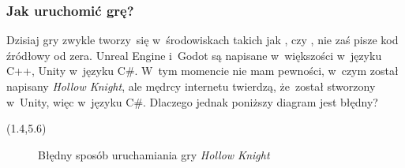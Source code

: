 \documentclass[10pt,t]{beamer}
\begin{document}
\begin{frame}
  \frametitle{Jak uruchomić grę?}


  Dzisiaj gry zwykle tworzy~się w~środowiskach takich jak
  ,
   czy
  , nie zaś pisze kod źródłowy
  od zera. Unreal Engine i~Godot są napisane w~większości w~języku C++,
  Unity w~języku C\#. W~tym momencie nie mam pewności, w~czym został
  napisany \textit{Hollow Knight}, ale mędrcy internetu twierdzą, że~został
  stworzony w~Unity, więc w~języku C\#. Dlaczego jednak poniższy diagram
  jest błędny?





  \begin{textblock}{10.1}(1.4,5.6)

    \begin{figure}

      \label{fig:Running-Hollow-Knight-good}


      \caption{Błędny sposób uruchamiania gry \textit{Hollow Knight}}


    \end{figure}

  \end{textblock}

\end{frame}
\end{document}

